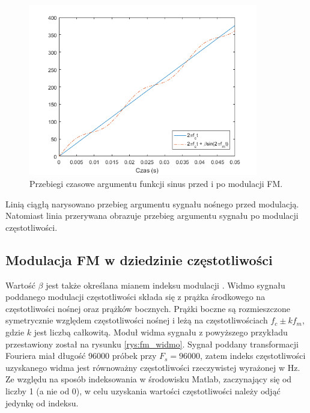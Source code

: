 \begin{figure}[H]
	\centering
	\includegraphics[width=10cm]{grafiki/fm_arg}
	\captionsetup{justification=centering}
	\caption{Przebiegi czasowe argumentu funkcji sinus przed i po modulacji FM.}
	\label{rys:fm_arg}
\end{figure}
Linią ciągłą narysowano przebieg argumentu sygnału nośnego przed modulacją. Natomiast linia przerywana obrazuje przebieg argumentu sygnału po modulacji częstotliwości.
\subsection{Modulacja FM w dziedzinie częstotliwości}
Wartość $\beta$ jest także określana mianem indeksu modulacji \cite{chowning}. Widmo sygnału poddanego modulacji częstotliwości składa się z prążka środkowego na częstotliwości nośnej oraz prążków bocznych. Prążki boczne są rozmieszczone symetrycznie względem częstotliwości nośnej i leżą na częstotliwościach $f_c \pm kf_m$, gdzie $k$ jest liczbą całkowitą. Moduł widma sygnału z powyższego przykładu przestawiony został na rysunku \ref{rys:fm_widmo}. Sygnał poddany transformacji Fouriera miał długość 96000 próbek przy $F_s = 96000$, zatem indeks częstotliwości uzyskanego widma jest równoważny częstotliwości rzeczywistej wyrażonej w Hz. Ze względu na sposób indeksowania w środowisku Matlab, zaczynający się od liczby 1 (a nie od 0), w celu uzyskania wartości częstotliwości należy odjąć jedynkę od indeksu.

